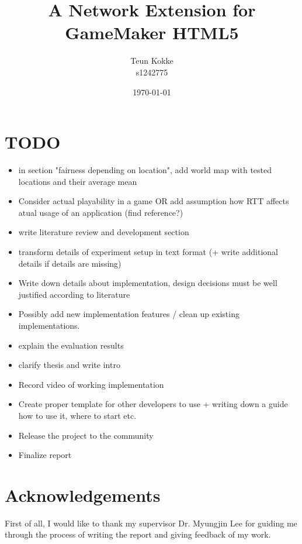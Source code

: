 \documentclass[bsc,frontabs,twoside,singlespacing,parskip,deptreport]{infthesis}     %
\begin{document}
\title{A Network Extension for GameMaker HTML5}

\author{Teun Kokke\\s1242775}

\date{\today}


\maketitle

\section*{TODO}
\begin{itemize}
\item in section "fairness depending on location", add world map with tested locations and their average mean
\item Consider actual playability in a game OR add assumption how RTT affects atual usage of an application (find reference?)
\item write literature review and development section
\item transform details of experiment setup in text format (+ write additional details if details are missing)
\item Write down details about implementation, design decisions must be well justified according to literature
\item Possibly add new implementation features / clean up existing implementations.
\item explain the evaluation results
\item clarify thesis and write intro
\item Record video of working implementation
\item Create proper template for other developers to use + writing down a guide how to use it, where to start etc.
\item Release the project to the community
\item Finalize report
\end{itemize}

\pagebreak
\section*{Acknowledgements}
First of all, I would like to thank my supervisor Dr. Myungjin Lee for guiding me through the process of writing the report and giving feedback of my work.
\end{document}
